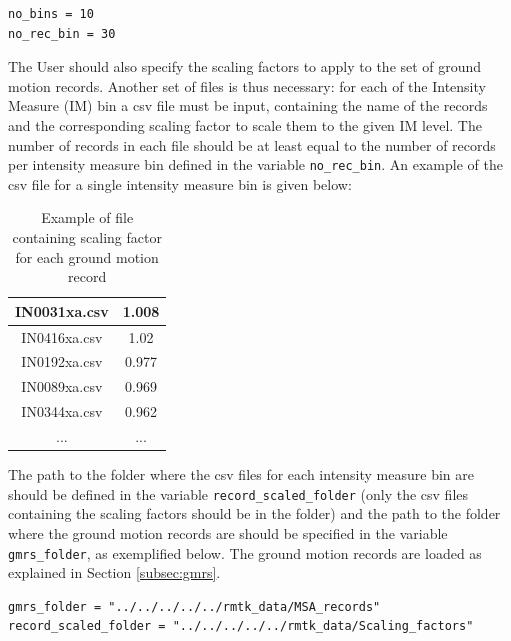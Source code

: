 \begin{Verbatim}[frame=single, commandchars=\\\{\}, samepage=true]
no_bins = 10
no_rec_bin = 30
\end{Verbatim}

The User should also specify the scaling factors to apply to the set of ground motion records. Another set of files is thus necessary: for each of the Intensity Measure (IM) bin a csv file must be input, containing the name of the records and the corresponding scaling factor to scale them to the given IM level. The number of records in each file should be at least equal to the number of records per intensity measure bin defined in the variable \verb=no_rec_bin=. An example of the csv file for a single intensity measure bin is given below:

\begin {table}[htb]
\caption{Example of file containing scaling factor for each ground motion record}
\label{table:pinching4}
\begin{center}
  \begin{tabular}{ | c | c |}
  \hline
	IN0031xa.csv & 1.008\\ \hline
	IN0416xa.csv & 1.02\\ \hline
	IN0192xa.csv & 0.977\\ \hline
	IN0089xa.csv & 0.969\\ \hline
	IN0344xa.csv & 0.962\\ \hline
	... & ... \\ \hline
	\end{tabular}
\end{center}
\end{table}

The path to the folder where the csv files for each intensity measure bin are should be defined in the variable \verb=record_scaled_folder= (only the csv files containing the scaling factors should be in the folder) and the path to the folder where the ground motion records are should be specified in the variable \verb=gmrs_folder=, as exemplified below. The ground motion records are loaded as explained in Section \ref{subsec:gmrs}.

\begin{Verbatim}[frame=single, commandchars=\\\{\}, samepage=true]
gmrs_folder = "../../../../../rmtk_data/MSA_records"
record_scaled_folder = "../../../../../rmtk_data/Scaling_factors"
\end{Verbatim}

